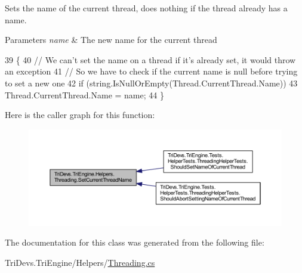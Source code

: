 Sets the name of the current thread, does nothing if the thread already has a name. 


\begin{DoxyParams}{Parameters}
{\em name} & The new name for the current thread\\
\hline
\end{DoxyParams}

\begin{DoxyCode}
39         \{
40             \textcolor{comment}{// We can't set the name on a thread if it's already set, it would throw an exception}
41             \textcolor{comment}{// So we have to check if the current name is null before trying to set a new one}
42             \textcolor{keywordflow}{if} (\textcolor{keywordtype}{string}.IsNullOrEmpty(Thread.CurrentThread.Name))
43                 Thread.CurrentThread.Name = name;
44         \}
\end{DoxyCode}


Here is the caller graph for this function\-:
\nopagebreak
\begin{figure}[H]
\begin{center}
\leavevmode
\includegraphics[width=350pt]{class_tri_devs_1_1_tri_engine_1_1_helpers_1_1_threading_a8e1f96975f0e6472d032d2c6ae2ba7d9_icgraph}
\end{center}
\end{figure}




The documentation for this class was generated from the following file\-:\begin{DoxyCompactItemize}
\item 
Tri\-Devs.\-Tri\-Engine/\-Helpers/\hyperlink{_threading_8cs}{Threading.\-cs}\end{DoxyCompactItemize}
